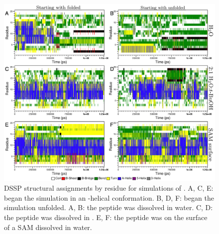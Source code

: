 \begin{figure}
    \center
    \includegraphics[width=\double]{figures-helix/dssp.png}
    \caption{
        DSSP structural assignments by residue for simulations of \pep{}. 
        A, C, E: \pep{} began the simulation in an \textalpha{}-helical conformation. 
        B, D, F: \pep{} began the simulation unfolded.
        A, B: the peptide was dissolved in water. 
        C, D: the peptide was dissolved in \tbawat{}. 
        E, F: the peptide was on the surface of a SAM dissolved in water.
    }
    \label{fig:helix-dssp}
\end{figure}

